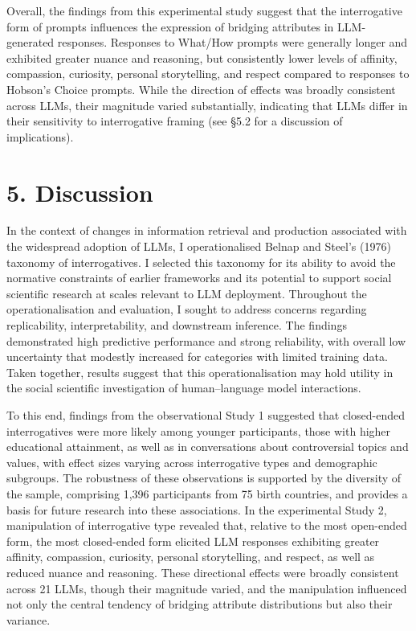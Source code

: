 \documentclass[
  12pt,
]{article}
\begin{document}
Overall, the findings from this experimental study suggest that the interrogative form of prompts influences the expression of bridging attributes in LLM-generated responses. Responses to What/How prompts were generally longer and exhibited greater nuance and reasoning, but consistently lower levels of affinity, compassion, curiosity, personal storytelling, and respect compared to responses to Hobson's Choice prompts. While the direction of effects was broadly consistent across LLMs, their magnitude varied substantially, indicating that LLMs differ in their sensitivity to interrogative framing (see §5.2 for a discussion of implications).

\section{5. Discussion}\label{discussion}

In the context of changes in information retrieval and production associated with the widespread adoption of LLMs, I operationalised Belnap and Steel's (1976) taxonomy of interrogatives. I selected this taxonomy for its ability to avoid the normative constraints of earlier frameworks and its potential to support social scientific research at scales relevant to LLM deployment. Throughout the operationalisation and evaluation, I sought to address concerns regarding replicability, interpretability, and downstream inference. The findings demonstrated high predictive performance and strong reliability, with overall low uncertainty that modestly increased for categories with limited training data. Taken together, results suggest that this operationalisation may hold utility in the social scientific investigation of human--language model interactions.

To this end, findings from the observational Study 1 suggested that closed-ended interrogatives were more likely among younger participants, those with higher educational attainment, as well as in conversations about controversial topics and values, with effect sizes varying across interrogative types and demographic subgroups. The robustness of these observations is supported by the diversity of the sample, comprising 1,396 participants from 75 birth countries, and provides a basis for future research into these associations. In the experimental Study 2, manipulation of interrogative type revealed that, relative to the most open-ended form, the most closed-ended form elicited LLM responses exhibiting greater affinity, compassion, curiosity, personal storytelling, and respect, as well as reduced nuance and reasoning. These directional effects were broadly consistent across 21 LLMs, though their magnitude varied, and the manipulation influenced not only the central tendency of bridging attribute distributions but also their variance.
\end{document}
